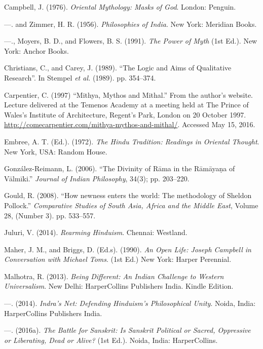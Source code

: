 \begin{thebibliography}{99}
 Campbell, J. (1976). \textit{Oriental Mythology: Masks of God}. London: Penguin.

  —. and Zimmer, H. R. (1956). \textit{Philosophies of India}. New York: Meridian Books.

  —., Moyers, B. D., and Flowers, B. S. (1991). \textit{The Power of Myth} (1st Ed.). New York: Anchor Books.

  Christians, C., and Carey, J. (1989). “The Logic and Aims of Qualitative Research”. In Stempel \textit{et al.} (1989). pp. 354--374.

  Carpentier, C. (1997) “Mithya, Mythos and Mithal.” From the author’s website. Lecture delivered at the Temenos Academy at a meeting held at The Prince of Wales's Institute of Architecture, Regent's Park, London on 20 October 1997. \url{http://comecarpentier.com/mithya-mythos-and-mithal/}. Accessed May 15, 2016.

  Embree, A. T. (Ed.). (1972). \textit{The Hindu Tradition: Readings in Oriental Thought}. New York, USA: Random House.

  González-Reimann, L. (2006). “The Divinity of Rāma in the Rāmāyaṇa of Vālmīki.” \textit{Journal of Indian Philosophy}, 34(3); pp. 203--220.

  Gould, R. (2008). “How newness enters the world: The methodology of Sheldon Pollock.” \textit{Comparative Studies of South Asia, Africa and the Middle East}, Volume 28, (Number 3). pp. 533--557.

  Juluri, V. (2014). \textit{Rearming Hinduism}. Chennai: Westland.

  Maher, J. M., and Briggs, D. (Ed.s). (1990). \textit{An Open Life: Joseph Campbell in Conversation with Michael Toms}. (1st Ed.) New York: Harper Perennial.

  Malhotra, R. (2013). \textit{Being Different: An Indian Challenge to Western Universalism}. New Delhi: HarperCollins Publishers India. Kindle Edition.

  —. (2014). \textit{Indra’s Net: Defending Hinduism’s Philosophical Unity}. Noida, India: HarperCollins Publishers India.

  —. (2016a). \textit{The Battle for Sanskrit: Is Sanskrit Political or Sacred, Oppressive or Liberating, Dead or Alive?} (1st Ed.). Noida, India: HarperCollins.


\end{thebibliography}
